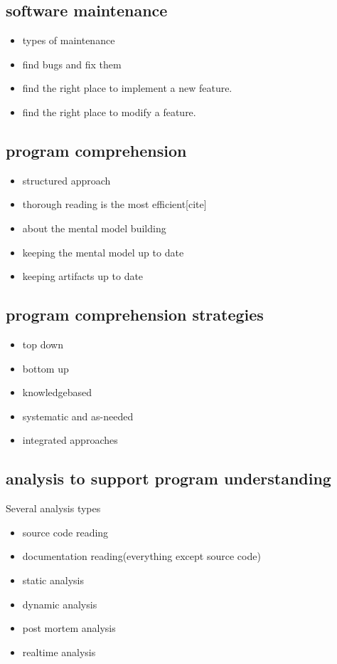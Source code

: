 \begin{itemize}
\subsection{software maintenance}

\begin{itemize}
\item types of maintenance
\item find bugs and fix them
\item find the right place to implement a new feature.
\item find the right place to modify a feature.
\end{itemize}

\subsection{program comprehension}

\begin{itemize}
\item structured approach
\item thorough reading is the most efficient[cite]
\item about the mental model building
\item keeping the mental model up to date
\item keeping artifacts up to date
\end{itemize}

\subsection{program comprehension strategies}

\begin{itemize}
\item top down
\item bottom up
\item knowledgebased
\item systematic and as-needed
\item integrated approaches
\end{itemize}

\subsection{analysis to support program understanding}

Several analysis types
\begin{itemize}
\item source code reading
\item documentation reading(everything except source code)
\item static analysis
\item dynamic analysis
\item post mortem analysis
\item realtime analysis
\end{itemize}


\end{itemize}
